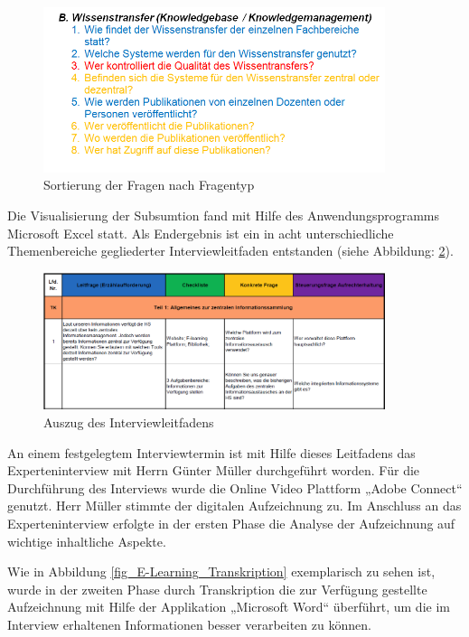 \begin{figure}[h!]
	\centering
	\includegraphics[width=10cm]{kapitel/gruppe2/bilder/sortierung_fragentyp}
	\caption{Sortierung der Fragen nach Fragentyp}
	\label{fig_sortierung_fragentyp}
\end{figure}

Die Visualisierung der Subsumtion fand mit Hilfe des Anwendungsprogramms Microsoft Excel statt. Als Endergebnis ist ein in acht unterschiedliche Themenbereiche gegliederter Interviewleitfaden entstanden (siehe Abbildung: \ref{fig_auszug_interviewleitfaden}).

\begin{figure}[h!]
	\centering
	\includegraphics[width=10cm]{kapitel/gruppe2/bilder/auszug_leitfaden}
	\caption{Auszug des Interviewleitfadens}
	\label{fig_auszug_interviewleitfaden}
\end{figure}

An einem festgelegtem Interviewtermin ist mit Hilfe dieses Leitfadens das Experteninterview mit Herrn Günter Müller durchgeführt worden. Für die Durchführung des Interviews wurde die Online Video Plattform „Adobe Connect“ genutzt. Herr Müller stimmte der digitalen Aufzeichnung zu. Im Anschluss an das Experteninterview erfolgte in der ersten Phase die Analyse der Aufzeichnung auf wichtige inhaltliche Aspekte.

Wie in Abbildung \ref{fig_E-Learning_Transkription} exemplarisch zu sehen ist, wurde in der zweiten Phase durch Transkription die zur Verfügung gestellte Aufzeichnung mit Hilfe der Applikation „Microsoft Word“ überführt, um die im Interview erhaltenen Informationen besser verarbeiten zu können.

